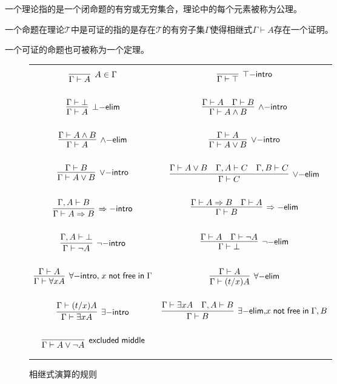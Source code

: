 \begin{definition}[理论]
	一个理论指的是一个闭命题的有穷或无穷集合，理论中的每个元素被称为公理。
\end{definition}
\begin{definition}[可证的命题]
	一个命题在理论$\mathcal{T}$中是可证的指的是存在$\mathcal{T}$的有穷子集$\Gamma$使得相继式$\Gamma\vdash A$存在一个证明。
	
	一个可证的命题也可被称为一个定理。
\end{definition}
\begin{figure}[!h]
	\centering
		\small
		\renewcommand\arraystretch{1.7}
			\begin{tabular}{|ll|}
			\hline
			$$
			\infer[A\in\Gamma]{\Gamma\vdash A}{}
			$$
			&
			$$
			\infer[\top\mathsf{-intro}]{\Gamma\vdash\top}{}
			$$\\
			$$
			\infer[\bot\mathsf{-elim}]{\Gamma\vdash A}{\Gamma\vdash \bot}
			$$
			&
			$$
			\infer[\wedge\mathsf{-intro}]{\Gamma\vdash A\wedge B}{\Gamma\vdash A & \Gamma\vdash B}
			$$\\
			$$
			\infer[\wedge\mathsf{-elim}]{\Gamma\vdash A}{\Gamma\vdash A\wedge B}
			$$
			&
			$$
			\infer[\vee\mathsf{-intro}]{\Gamma\vdash A\vee B}{\Gamma\vdash A}
			$$\\
			$$
			\infer[\vee\mathsf{-intro}]{\Gamma\vdash A\vee B}{\Gamma\vdash B}
			$$
			&
			$$
			\infer[\vee\mathsf{-elim}]{\Gamma\vdash C}{\Gamma\vdash A\vee B & \Gamma,A\vdash C & \Gamma, B\vdash C}
			$$\\
			$$
			\infer[\Rightarrow\mathsf{-intro}]{\Gamma\vdash A\Rightarrow B}{\Gamma, A\vdash B}
			$$
			&
			$$
			\infer[\Rightarrow\mathsf{-elim}]{\Gamma\vdash B}{\Gamma\vdash A\Rightarrow B & \Gamma\vdash A}
			$$\\
			$$
			\infer[\neg\mathsf{-intro}]{\Gamma\vdash\neg A}{\Gamma,A\vdash \bot}
			$$
			&
			$$
			\infer[\neg\mathsf{-elim}]{\Gamma\vdash \bot}{\Gamma\vdash A & \Gamma\vdash \neg A}
			$$\\
			$$
			\infer[{\forall\mathsf{-intro},}\;{x\;\mathsf{not}\;\mathsf{free}\;\mathsf{in}\;\Gamma}]{\Gamma\vdash\forall x A}{\Gamma\vdash A}
			$$
			&
			$$
			\infer[\forall\mathsf{-elim}]{\Gamma\vdash (t/x)A}{\Gamma\vdash A}
			$$\\
			$$
			\infer[\exists\mathsf{-intro}]{\Gamma\vdash\exists x A}{\Gamma\vdash (t/x)A}
			$$
			&
			$$
			\infer[\exists\mathsf{-elim,}x\;\mathsf{not}\;\mathsf{free}\;\mathsf{in}\;\Gamma,B]{\Gamma\vdash B}{\Gamma\vdash\exists x A & \Gamma,A\vdash B}
			$$\\
			$$
			\infer[\mathsf{excluded}\;\mathsf{middle}]{\Gamma\vdash A\vee\neg A}{}
			$$&{}
			\\
			\hline
		\end{tabular}
	\caption{相继式演算的规则}
	\label{preliminary:sequent:calculus}
\end{figure}

